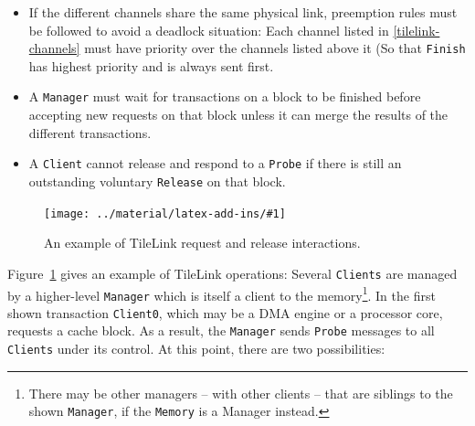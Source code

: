 \documentclass[journal,a4paper]{IEEEtran}
\newcommand*{\COMPILEIMAGES}{}%
\newcommand\inputimage[1]{%
	\ifdefined\COMPILEIMAGES
		
	\else
		\texttt{[image: ../material/latex-add-ins/\#1]}
	\fi
}
\begin{document}
\begin{itemize}
	\item If the different channels share the same physical link, preemption rules must be followed to avoid a deadlock situation: Each channel listed in \ref{tilelink-channels} must have priority over the channels listed above it (So that \texttt{Finish} has highest priority and is always sent first.
	\item A \texttt{Manager} must wait for transactions on a block to be finished before accepting new requests on that block unless it can merge the results of the different transactions.
	\item A \texttt{Client} cannot release and respond to a \texttt{Probe} if there is still an outstanding voluntary \texttt{Release} on that block.
\end{itemize}


\begin{figure}%
	\centering
	\inputimage{image3}
	\caption{An example of TileLink request and release interactions.}
	\label{tile-transfer}
\end{figure}
Figure~\ref{tile-transfer} gives an example of TileLink operations: Several \texttt{Clients} are managed by a higher-level \texttt{Manager} which is itself a client to the memory\footnote{There may be other managers -- with other clients -- that are siblings to the shown \texttt{Manager}, if the \texttt{Memory} is a Manager instead.}.
In the first shown transaction \texttt{Client0}, which may be a DMA engine or a processor core, requests a cache block. As a result, the \texttt{Manager} sends \texttt{Probe} messages to all \texttt{Clients} under its control.
At this point, there are two possibilities:
\end{document}
